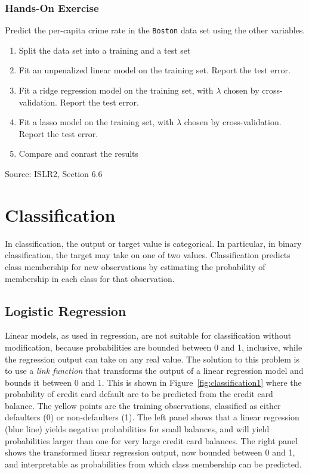\begin{tcolorbox}[colback=code]
\subsubsection*{Hands-On Exercise} 

Predict the per-capita crime rate in the \texttt{Boston} data set using the other variables.
  \begin{enumerate}
      \item Split the data set into a training and a test set
      \item Fit an unpenalized linear model on the training set. Report the test error.
      \item Fit a ridge regression model on the training set, with $\lambda$ chosen by cross-validation. Report the test error.
      \item Fit a lasso model on the training set, with $\lambda$ chosen by cross-validation. Report the test error.
      \item Compare and conrast the results
  \end{enumerate}

\footnotesize Source: ISLR2, Section 6.6 \normalsize
\end{tcolorbox}

\section{Classification}

In classification, the output or target value is categorical. In particular, in binary classification, the target may take on one of two values. Classification predicts class membership for new observations by estimating the probability of membership in each class for that observation. 

\subsection{Logistic Regression}

Linear models, as used in regression, are not suitable for classification without modification, because probabilities are bounded between 0 and 1, inclusive, while the regression output can take on any real value. The solution to this problem is to use a \emph{link function} that transforms the output of a linear regression model and bounds it between 0 and 1. This is shown in Figure~\ref{fig:classification1} where the probability of credit card default are to be predicted from the credit card balance. The yellow points are the training observations, classified as either defaulters (0) or non-defaulters (1). The left panel shows that a linear regression (blue line) yields negative probabilities for small balances, and will yield probabilities larger than one for very large credit card balances. The right panel shows the transformed linear regression output, now bounded between 0 and 1, and interpretable as probabilities from which class membership can be predicted.


